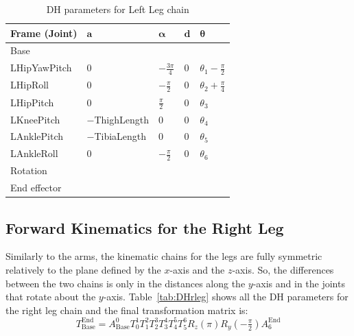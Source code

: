 \begin{table}[!t]
\centering
\caption{DH parameters for Left Leg chain}
\begin{tabular}{|l|>{\centering\arraybackslash}m{2.55cm}|>{\centering\arraybackslash}m{2.55cm}|>{\centering\arraybackslash}m{2.55cm}|>{\centering\arraybackslash}m{2.55cm}|}
\hline
\textbf{Frame (Joint)} & $\mathbf{a}$ & $\boldsymbol{\alpha}$ & $\mathbf{d}$ & $\boldsymbol{\theta}$\\ \hline
Base & \multicolumn{4}{c|}{$A(0,\text{\footnotesize{HipOffsetY}},\text{\footnotesize{$-$HipOffsetZ}})$} \\ \hline
LHipYawPitch & $0$ & $-\frac{3\pi}{4}$ & $0$ & $\theta_1 - \frac{\pi}{2}$ \\ \hline
LHipRoll & $0$ & $-\frac{\pi}{2}$ & $0$ & $\theta_2 + \frac{\pi}{4}$ \\ \hline
LHipPitch & $0$ & $\frac{\pi}{2}$ & $0$ & $\theta_3$ \\ \hline
LKneePitch & \footnotesize{$-$ThighLength} & $0$ & $0$ & $\theta_4$ \\ \hline
LAnklePitch & \footnotesize{$-$TibiaLength} & $0$ & $0$ & $\theta_5$ \\ \hline
LAnkleRoll & $0$ & $-\frac{\pi}{2}$ & $0$ & $\theta_6$ \\ \hline
Rotation & \multicolumn{4}{c|}{$R_z(\pi)R_y(-\tfrac{\pi}{2})$} \\ \hline
End effector & \multicolumn{4}{c|}{$A(0,0,\text{\footnotesize{$-$FootHeight}})$} \\ \hline
\end{tabular}
\label{tab:DHlleg}
\end{table}



\subsection{Forward Kinematics for the Right Leg}
Similarly to the arms, the kinematic chains for the legs are fully symmetric relatively to the plane defined by the $x$-axis and the $z$-axis. So, the differences between the two chains is only in the distances along the $y$-axis and in the joints that rotate about the $y$-axis. Table~\ref{tab:DHrleg} shows all the DH parameters for the right leg chain and the final transformation matrix is: 
\[
T^\text{End}_\text{Base} = A^0_\text{Base}T^1_0T^2_1T^3_2T^4_3T^5_4T^6_5R_z(\pi)R_y(-\tfrac{\pi}{2})A^\text{End}_{6}
\]

